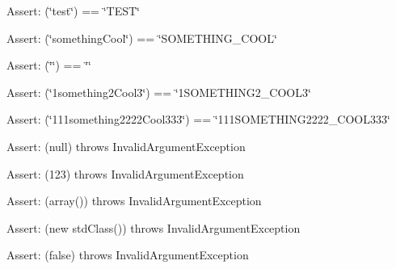 \begin{Desc}
\item[Assert:](\char`\"{}test\char`\"{}) == \char`\"{}TEST\char`\"{} \end{Desc}
\begin{Desc}
\item[Assert:](\char`\"{}somethingCool\char`\"{}) == \char`\"{}SOMETHING\_\-COOL\char`\"{} \end{Desc}
\begin{Desc}
\item[Assert:](\char`\"{}\char`\"{}) == \char`\"{}\char`\"{} \end{Desc}
\begin{Desc}
\item[Assert:](\char`\"{}1something2Cool3\char`\"{}) == \char`\"{}1SOMETHING2\_\-COOL3\char`\"{} \end{Desc}
\begin{Desc}
\item[Assert:](\char`\"{}111something2222Cool333\char`\"{}) == \char`\"{}111SOMETHING2222\_\-COOL333\char`\"{}\end{Desc}
\begin{Desc}
\item[Assert:](null) throws InvalidArgumentException \end{Desc}
\begin{Desc}
\item[Assert:](123) throws InvalidArgumentException \end{Desc}
\begin{Desc}
\item[Assert:](array()) throws InvalidArgumentException \end{Desc}
\begin{Desc}
\item[Assert:](new stdClass()) throws InvalidArgumentException \end{Desc}
\begin{Desc}
\item[Assert:](false) throws InvalidArgumentException \end{Desc}


